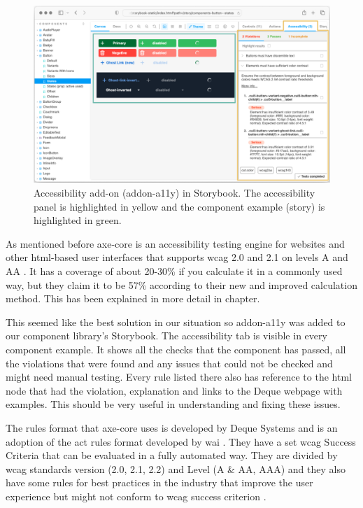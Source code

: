 \documentclass{master_thesis}
\begin{document}
\begin{figure}[h]
	\includegraphics[width=\textwidth]{img/addon-a11y.png}
	\caption{Accessibility add-on (addon-a11y) in Storybook. The accessibility panel is highlighted in yellow and the component example (story) is highlighted in green.}
	\label{fig:addon-a11y}
\end{figure}

As mentioned before axe-core is an accessibility testing engine for websites and other \ac{html}-based user interfaces that supports \ac{wcag} 2.0 and 2.1 on levels A and AA \citep{Deque2023}. It has a coverage of about 20-30\% if you calculate it in a commonly used way, but they claim it to be 57\% according to their new and improved calculation method. This has been explained in more detail in  chapter.

This seemed like the best solution in our situation so addon-a11y was added to our component library’s Storybook. The accessibility tab is visible in every component example. It shows all the checks that the component has passed, all the violations that were found and any issues that could not be checked and might need manual testing. Every rule listed there also has reference to the \ac{html} node that had the violation, explanation and links to the Deque webpage with examples. This should be very useful in understanding and fixing these issues.

The rules format that axe-core uses is developed by Deque Systems and is an adoption of the \ac{act} rules format developed by \ac{wai} \citep{Fiers2017}. They have a set \ac{wcag} Success Criteria that can be evaluated in a fully automated way. They are divided by \ac{wcag} standards version (2.0, 2.1, 2.2) and Level (A \& AA, AAA) and they also have some rules for best practices in the industry that improve the user experience but might not conform to \ac{wcag} success criterion \citep{Fiers2023}.
\end{document}
